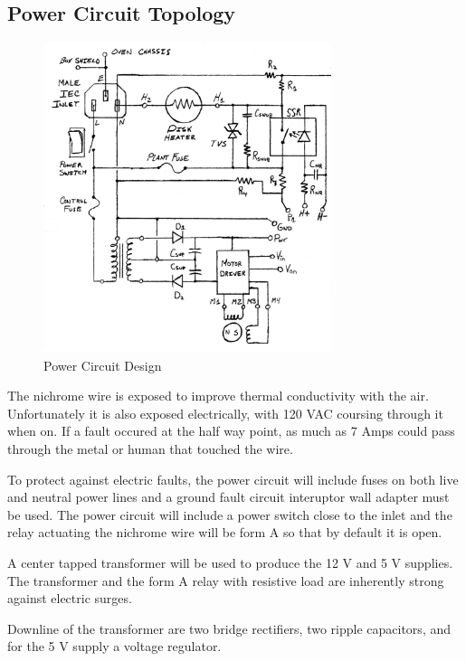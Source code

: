 \documentclass[10pt, twocolumn]{article}
\begin{document}
\subsection{Power Circuit Topology}

\begin{figure}
	\centering
	\includegraphics[width=0.75\textwidth]{Figures/power-circuit.pdf}
	\caption{Power Circuit Design}
	\label{power-circuit}
\end{figure}

The nichrome wire is exposed to improve thermal conductivity with the air.
Unfortunately it is also exposed electrically, with 120 VAC coursing through
it when on. If a fault occured at the half way point, as much as 7 Amps could
pass through the metal or human that touched the wire.

To protect against electric faults, the power circuit will include fuses
on both live and neutral power lines and a ground fault circuit interuptor
wall adapter must be used. The power circuit will include a power
switch close to the inlet and the relay actuating the nichrome wire will
be form A so that by default it is open.

A center tapped transformer will be used to produce the 12 V and 5 V supplies.
The transformer and the form A relay with resistive load are
inherently strong against electric surges.

Downline of the transformer are two bridge rectifiers, two ripple capacitors,
and for the 5 V supply a voltage regulator.
\end{document}
